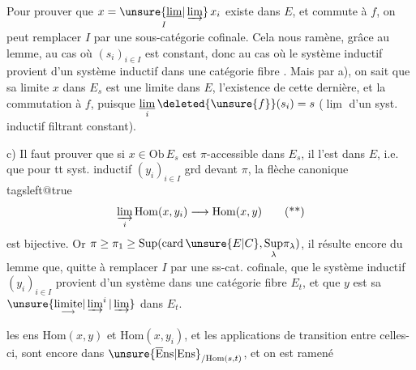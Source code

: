 Pour prouver que $x=\underset I{\unsure{\underline{\lim}|\varinjlim}}\,x_i$ existe dans $E$, et commute à $f$, on peut remplacer $I$ par une sous-catégorie cofinale. Cela nous ramène, grâce au lemme, au cas où $(s_i)_{i\in I}$ est constant, donc au cas où le système inductif provient d'un système inductif dans une catégorie fibre . Mais par a), on sait que sa limite $x$ dans $E_s$ est une limite dans $E$,  l'existence de cette dernière, et la commutation à $f$, puisque $\underset i{\underline{\lim}}\,\deleted{\unsure{f}}(s_i)=s$ ($\underline{\lim}$ d'un syst. inductif filtrant constant).

c) Il faut prouver que si $x\in\mathrm{Ob}\,E_s$ est $\pi$-accessible  dans $E_s$, il l'est dans $E$, i.e. que pour tt syst. inductif $(y_i)_{i\in I}$ grd devant $\pi$, la flèche canonique
{\csname tagsleft@true\endcsname
\[\varinjlim_i\mathrm{Hom}(x,y_i)\longrightarrow\mathrm{Hom}(x,y)\tag*{(**)}\]}
est bijective. Or   $\pi\geq\pi_1\geq\mathrm{Sup}(\mathrm{card}\,\unsure{E|C},\underset{\lambda}{\mathrm{Sup}}\pi_\lambda)$, il résulte encore du lemme que, quitte à remplacer $I$ par une ss-cat. cofinale,  que le système inductif $(y_i)_{i\in I}$ provient d'un système dans  une catégorie fibre $E_t$, et que $y$ est sa $\unsure{\underset{\longrightarrow}{\mathrm{limite}}|\varinjlim^{i}|\varinjlim}$ dans $E_t$.

  les ens $\mathrm{Hom}(x,y)$ et $\mathrm{Hom}(x,y_i)$, et les  applications de transition entre celles-ci, sont encore dans $\unsure{\overline{\mathrm E}\mathrm{ns}|\mathrm{Ens}}_{/\mathrm{Hom}(s,t)}$, et on est ramené

